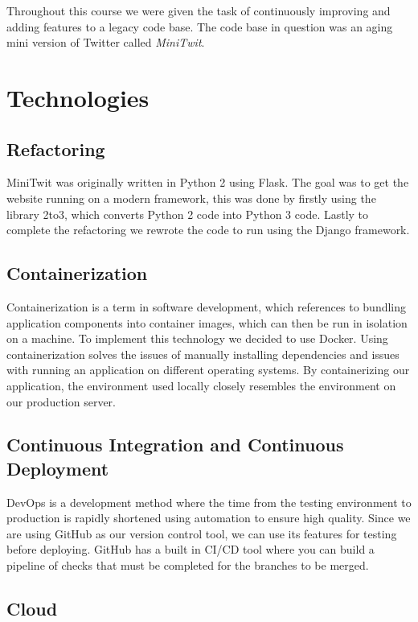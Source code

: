 Throughout this course we were given the task of continuously improving and adding features to a legacy code base. The code base in question was an aging mini version of Twitter called \textit{MiniTwit}.

\section*{Technologies}

\subsection*{Refactoring}

MiniTwit was originally written in Python 2 using Flask. The goal was to get the website running on a modern framework, this was done by firstly using the library 2to3, which converts Python 2 code into Python 3 code. Lastly to complete the refactoring we rewrote the code to run using the Django framework.

\subsection*{Containerization}

Containerization is a term in software development, which references to bundling application components into container images, which can then be run in isolation on a machine. To implement this technology we decided to use Docker. Using containerization solves the issues of manually installing dependencies and issues with running an application on different operating systems. By containerizing our application, the environment used locally closely resembles the environment on our production server.

\subsection*{Continuous Integration and Continuous Deployment}

DevOps is a development method where the time from the testing environment to production is rapidly shortened using automation to ensure high quality. Since we are using GitHub as our version control tool, we can use its features for testing before deploying. GitHub has a built in CI/CD tool where you can build a pipeline of checks that must be completed for the branches to be merged.

\subsection*{Cloud}

